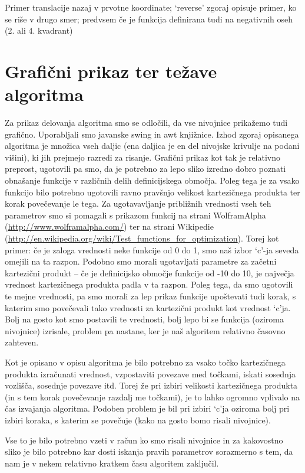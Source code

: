 \documentclass[a4paper,11pt]{article}
\begin{document}
\small{Primer translacije nazaj v prvotne koordinate; `reverse' zgoraj opisuje primer, ko se riše v drugo smer; predvsem če je funkcija definirana tudi na negativnih oseh (2. ali 4. kvadrant)}


\section{Grafični prikaz ter težave algoritma}

Za prikaz delovanja algoritma smo se odločili, da vse nivojnice prikažemo tudi grafično. Uporabljali smo javanske swing in awt knjižnice. Izhod zgoraj opisanega algoritma je množica vseh daljic (ena daljica je en del nivojske krivulje na podani višini), ki jih prejmejo razredi za risanje. Grafični prikaz kot tak je relativno preprost, ugotovili pa smo, da je potrebno za lepo sliko izredno dobro poznati obnašanje funkcije v različnih delih definicijskega območja. Poleg tega je za vsako funkcijo bilo potrebno ugotovili ravno pravšnjo velikost kartezičnega produkta ter korak povečevanje le tega. Za ugotavavljanje približnih vrednosti vseh teh parametrov smo si pomagali s prikazom funkcij na strani WolframAlpha (\href{http://www.wolframalpha.com/}{\underline{http://www.wolframalpha.com/}}) ter na strani Wikipedie\\ (\href{http://en.wikipedia.org/wiki/Test_functions_for_optimization}{\underline{http://en.wikipedia.org/wiki/Test\_functions\_for\_optimization}}). Torej kot primer: če je zaloga vrednosti neke funkcije od 0 do 1, smo naš izbor `c'-ja seveda omejili na ta razpon. Podobno smo morali ugotavljati parametre za začetni kartezični produkt – če je definicijsko območje funkcije od -10 do 10, je največja vrednost kartezičnega produkta padla v ta razpon. Poleg tega, da smo ugotovili te mejne vrednosti, pa smo morali za lep prikaz funkcije upoštevati tudi korak, s katerim smo povečevali tako vrednosti za kartezični produkt kot vrednost `c'ja. Bolj na gosto kot smo postavili te vrednosti, bolj lepo bi se funkcija (oziroma nivojnice) izrisale, problem pa nastane, ker je naš algoritem relativno časovno zahteven.
\par
Kot je opisano v opisu algoritma je bilo potrebno za vsako točko kartezičnega produkta izračunati vrednost, vzpostaviti povezave med točkami, iskati sosednja vozlišča, sosednje povezave itd. Torej že pri izbiri velikosti kartezičnega produkta (in s tem korak povečevanje razdalj me točkami), je to lahko ogromno vplivalo na čas izvajanja algoritma. Podoben problem je bil pri izbiri `c'ja oziroma bolj pri izbiri koraka, s katerim se povečuje (kako na gosto bomo risali nivojnice).
\par
Vse to je bilo potrebno vzeti v račun ko smo risali nivojnice in za kakovostno sliko je bilo potrebno kar dosti iskanja pravih parametrov sorazmerno s tem, da nam je v nekem relativno kratkem času algoritem zaključil.
\end{document}
